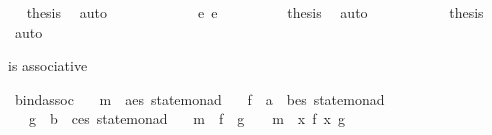 \begin{isabellebody}
\ \isamarkupfalse%
\ {\isacharquery}{\kern0pt}thesis\ \isamarkupfalse%
\ auto\isanewline
\ \ \ \ \isamarkupfalse%
\isanewline
\ \ \ \ \ \ \isamarkupfalse%
\ {\isacharparenleft}{\kern0pt}e\ e{\isacharparenright}{\kern0pt}\isanewline
\ \ \ \ \ \ \isamarkupfalse%
\ \isamarkupfalse%
\ {\isacharquery}{\kern0pt}thesis\ \isamarkupfalse%
\ auto\isanewline
\ \ \ \ \isamarkupfalse%
\isanewline
\ \ \isamarkupfalse%
\isanewline
\ \ \isamarkupfalse%
\ {\isacharquery}{\kern0pt}thesis\ \isamarkupfalse%
\ auto\isanewline
{}\isamarkupfalse%
%
\endisatagproof
{\isafoldproof}%
%
\isadelimproof
%
\endisadelimproof
%
\begin{isamarkuptext}%
\isa{{\isacharparenleft}{\kern0pt}{\isasymbind}{\isacharparenright}{\kern0pt}} is associative%
\end{isamarkuptext}\isamarkuptrue%
\isamarkupfalse%
\ bind{\isacharunderscore}{\kern0pt}assoc{\isacharcolon}{\kern0pt}\isanewline
\ \ \ m\ {\isacharcolon}{\kern0pt}{\isacharcolon}{\kern0pt}\ {\isachardoublequoteopen}{\isacharparenleft}{\kern0pt}{\isacharprime}{\kern0pt}a{\isacharcomma}{\kern0pt}{\isacharprime}{\kern0pt}e{\isacharcomma}{\kern0pt}{\isacharprime}{\kern0pt}s{\isacharparenright}{\kern0pt}\ state{\isacharunderscore}{\kern0pt}monad{\isachardoublequoteclose}\isanewline
\ \ \ f\ {\isacharcolon}{\kern0pt}{\isacharcolon}{\kern0pt}\ {\isachardoublequoteopen}{\isacharprime}{\kern0pt}a\ {\isasymRightarrow}\ {\isacharparenleft}{\kern0pt}{\isacharprime}{\kern0pt}b{\isacharcomma}{\kern0pt}{\isacharprime}{\kern0pt}e{\isacharcomma}{\kern0pt}{\isacharprime}{\kern0pt}s{\isacharparenright}{\kern0pt}\ state{\isacharunderscore}{\kern0pt}monad{\isachardoublequoteclose}\isanewline
\ \ \ g\ {\isacharcolon}{\kern0pt}{\isacharcolon}{\kern0pt}\ {\isachardoublequoteopen}{\isacharprime}{\kern0pt}b\ {\isasymRightarrow}\ {\isacharparenleft}{\kern0pt}{\isacharprime}{\kern0pt}c{\isacharcomma}{\kern0pt}{\isacharprime}{\kern0pt}e{\isacharcomma}{\kern0pt}{\isacharprime}{\kern0pt}s{\isacharparenright}{\kern0pt}\ state{\isacharunderscore}{\kern0pt}monad{\isachardoublequoteclose}\isanewline
\ \ \ {\isachardoublequoteopen}{\isacharparenleft}{\kern0pt}m\ {\isasymbind}\ f{\isacharparenright}{\kern0pt}\ {\isasymbind}\ g\ \ {\isacharequal}{\kern0pt}\ \ m\ {\isasymbind}\ {\isacharparenleft}{\kern0pt}{\isasymlambda}x{\isachardot}{\kern0pt}\ f\ x{\isasymbind}\ g{\isacharparenright}{\kern0pt}{\isachardoublequoteclose}\isanewline

\end{isabellebody}
